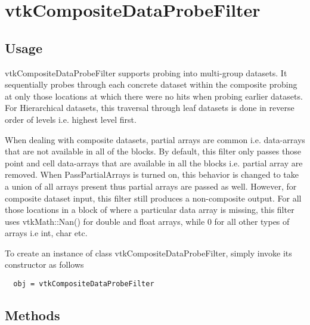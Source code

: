 \section{vtkCompositeDataProbeFilter}

\subsection{Usage}

 vtkCompositeDataProbeFilter supports probing into multi-group datasets.
 It sequentially probes through each concrete dataset within the composite 
 probing at only those locations at which there were no hits when probing
 earlier datasets. For Hierarchical datasets, this traversal through leaf
 datasets is done in reverse order of levels i.e. highest level first.

 When dealing with composite datasets, partial arrays are common i.e.
 data-arrays that are not available in all of the blocks. By default, this
 filter only passes those point and cell data-arrays that are available in all
 the blocks i.e. partial array are removed.
 When PassPartialArrays is turned on, this behavior is changed to take a
 union of all arrays present thus partial arrays are passed as well. However,
 for composite dataset input, this filter still produces a non-composite
 output. For all those locations in a block of where a particular data array
 is missing, this filter uses vtkMath::Nan() for double and float arrays,
 while 0 for all other types of arrays i.e int, char etc.

To create an instance of class vtkCompositeDataProbeFilter, simply
invoke its constructor as follows
\begin{verbatim}
  obj = vtkCompositeDataProbeFilter
\end{verbatim}
\subsection{Methods}

